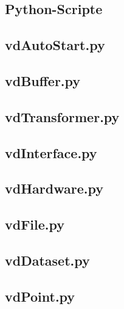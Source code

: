 \documentclass[a4paper,12pt,bibliography=totoc, listof=totoc,titlepage,pointlessnumbers]{scrreprt}
\begin{document}
\begin{appendices}

\chapter{Python-Scripte}
\label{a:skripte}
\section{vdAutoStart.py}
\label{a:vdAutoStart.py}


\section{vdBuffer.py}
\label{a:vdBuffer.py}


\section{vdTransformer.py}
\label{a:vdTransformer.py}


\section{vdInterface.py}
\label{a:vdInterface.py}


\section{vdHardware.py}
\label{a:vdHardware.py}


\section{vdFile.py}
\label{a:vdFile.py}


\section{vdDataset.py}
\label{a:vdDataset.py}


\section{vdPoint.py}
\label{a:vdPoint.py}



\end{appendices}
\end{document}

